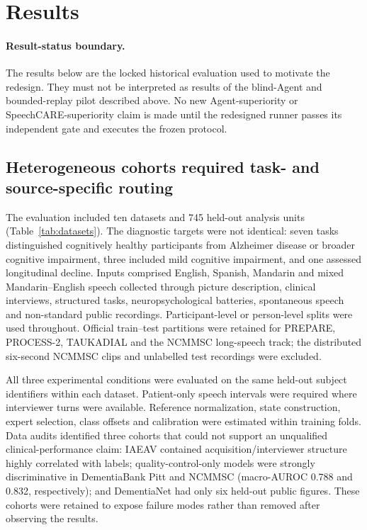 \documentclass[pdflatex,sn-nature]{sn-jnl}
\begin{document}
\section{Results}\label{sec:results}

\paragraph{Result-status boundary.}
The results below are the locked historical evaluation used to motivate the redesign. They must not be interpreted as results of the blind-Agent and bounded-replay pilot described above. No new Agent-superiority or SpeechCARE-superiority claim is made until the redesigned runner passes its independent gate and executes the frozen protocol.

\subsection{Heterogeneous cohorts required task- and source-specific routing}

The evaluation included ten datasets and 745 held-out analysis units (Table~\ref{tab:datasets}). The diagnostic targets were not identical: seven tasks distinguished cognitively healthy participants from Alzheimer disease or broader cognitive impairment, three included mild cognitive impairment, and one assessed longitudinal decline. Inputs comprised English, Spanish, Mandarin and mixed Mandarin--English speech collected through picture description, clinical interviews, structured tasks, neuropsychological batteries, spontaneous speech and non-standard public recordings. Participant-level or person-level splits were used throughout. Official train--test partitions were retained for PREPARE, PROCESS-2, TAUKADIAL and the NCMMSC long-speech track; the distributed six-second NCMMSC clips and unlabelled test recordings were excluded.

All three experimental conditions were evaluated on the same held-out subject identifiers within each dataset. Patient-only speech intervals were required where interviewer turns were available. Reference normalization, state construction, expert selection, class offsets and calibration were estimated within training folds. Data audits identified three cohorts that could not support an unqualified clinical-performance claim: IAEAV contained acquisition/interviewer structure highly correlated with labels; quality-control-only models were strongly discriminative in DementiaBank Pitt and NCMMSC (macro-AUROC 0.788 and 0.832, respectively); and DementiaNet had only six held-out public figures. These cohorts were retained to expose failure modes rather than removed after observing the results.
\end{document}
